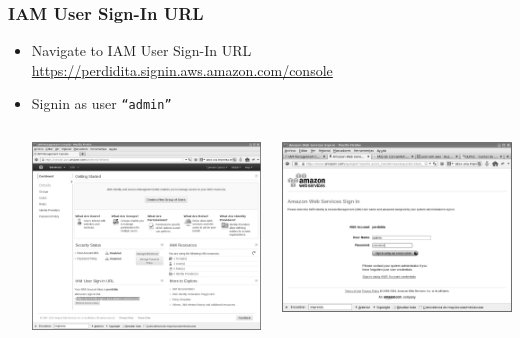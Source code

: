 \documentclass{beamer}
\begin{document}
\begin{frame}[fragile]
\frametitle{IAM User Sign-In URL}
\begin{itemize}
\item Navigate to IAM User Sign-In URL  \url{https://perdidita.signin.aws.amazon.com/console}
\item Signin as user \texttt{``admin''}
\begin{columns}
\begin{center}
\includegraphics[scale=0.10]{siginurl.eps}
\end{center}
\begin{center}
\includegraphics[scale=0.10]{siginurl1.eps}
\end{center}
\end{columns}
\end{itemize}
\end{frame}
\end{document}
